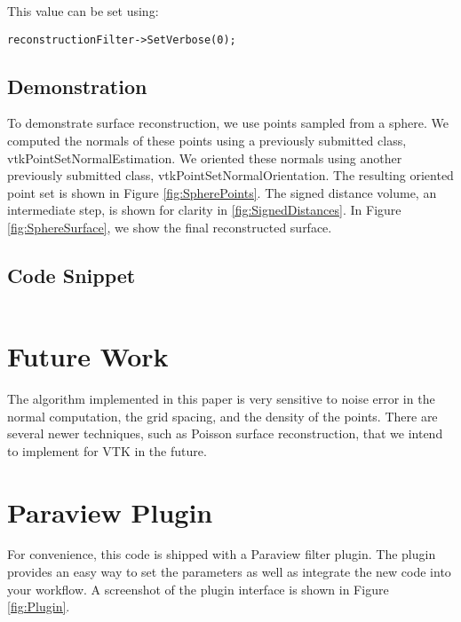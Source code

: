 \documentclass{InsightArticle}
\begin{document}
This value can be set using:
\begin{verbatim}
reconstructionFilter->SetVerbose(0);
\end{verbatim}


\subsection{Demonstration}
To demonstrate surface reconstruction, we use points sampled from a sphere. We computed the normals of these points using a previously submitted class, vtkPointSetNormalEstimation. We oriented these normals using another previously submitted class, vtkPointSetNormalOrientation. The resulting oriented point set is shown in Figure \ref{fig:SpherePoints}. The signed distance volume, an intermediate step, is shown for clarity in \ref{fig:SignedDistances}. In Figure \ref{fig:SphereSurface}, we show the final reconstructed surface.
% 

\subsection{Code Snippet}
\begin{verbatim}

\end{verbatim}

\section{Future Work}
The algorithm implemented in this paper is very sensitive to noise error in the normal computation, the grid spacing, and the density of the points. There are several newer techniques, such as Poisson surface reconstruction, that we intend to implement for VTK in the future.

\pagebreak
\section{Paraview Plugin}
For convenience, this code is shipped with a Paraview filter plugin. The plugin provides an easy way to set the parameters as well as integrate the new code into your workflow. A screenshot of the plugin interface is shown in Figure \ref{fig:Plugin}.




\end{document}

